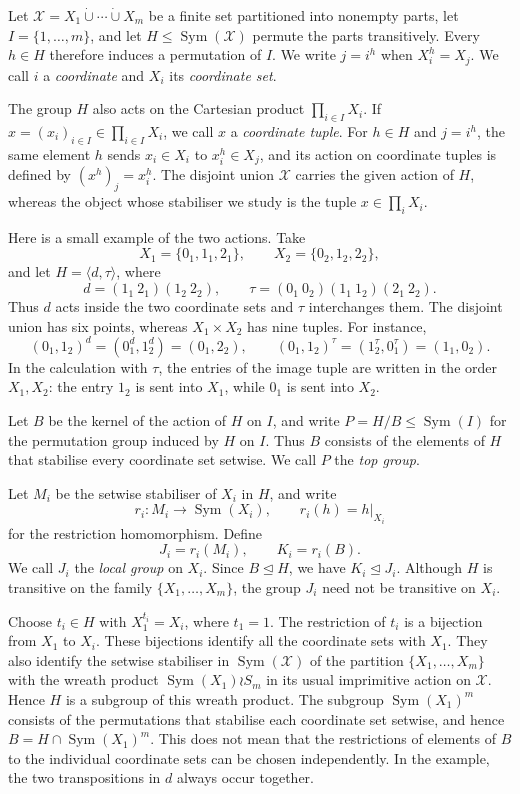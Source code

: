 \documentclass[10pt]{amsart}
\theoremstyle{definition}
\renewcommand{\leq}{\leqslant}
\DeclareMathOperator{\Sym}{Sym}
\numberwithin{equation}{section}
\numberwithin{table}{section}
\begin{document}
Let $\mathcal X=X_1\mathbin{\dot\cup}\cdots\mathbin{\dot\cup}X_m$ be a
finite set partitioned into nonempty parts, let $I=\{1,\ldots,m\}$, and
let $H\leq\Sym(\mathcal X)$ permute the parts transitively. Every $h\in H$
therefore induces a permutation of $I$. We write $j=i^h$ when
$X_i^h=X_j$. We call $i$ a {\it coordinate} and $X_i$ its
{\it coordinate set}.

The group $H$ also acts on the Cartesian product $\prod_{i\in I}X_i$. If
$x=(x_i)_{i\in I}\in\prod_{i\in I}X_i$, we call $x$ a {\it coordinate
tuple}. For $h\in H$ and $j=i^h$, the same element $h$ sends
$x_i\in X_i$ to $x_i^h\in X_j$, and its action on coordinate tuples is
defined by $(x^h)_j=x_i^h$.
The disjoint union $\mathcal X$ carries the given action of $H$, whereas the
object whose stabiliser we study is the tuple $x\in\prod_iX_i$.

Here is a small example of the two actions. Take
$$
  X_1=\{0_1,1_1,2_1\},\qquad X_2=\{0_2,1_2,2_2\},
$$
and let $H=\langle d,\tau\rangle$, where
$$
  d=(1_1\ 2_1)(1_2\ 2_2),\qquad
  \tau=(0_1\ 0_2)(1_1\ 1_2)(2_1\ 2_2).
$$
Thus $d$ acts inside the two coordinate sets and $\tau$ interchanges them.
The disjoint union has six points, whereas $X_1\times X_2$ has nine tuples.
For instance,
$$
  (0_1,1_2)^d=(0_1^d,1_2^d)=(0_1,2_2),\qquad
  (0_1,1_2)^\tau=(1_2^\tau,0_1^\tau)=(1_1,0_2).
$$
In the calculation with $\tau$, the entries of the image tuple are written in
the order $X_1,X_2$: the entry $1_2$ is sent into $X_1$, while $0_1$ is sent
into $X_2$.

Let $B$ be the kernel of the action of $H$ on $I$, and write
$P=H/B\leq\Sym(I)$ for the permutation group induced by $H$ on $I$.
Thus $B$ consists of the elements of $H$ that stabilise every coordinate
set setwise. We call $P$ the {\it top group}.

Let $M_i$ be the setwise stabiliser of $X_i$ in $H$, and write
$$
  r_i:M_i\longrightarrow\Sym(X_i),\qquad r_i(h)=h|_{X_i}
$$
for the restriction homomorphism. Define
$$
  J_i=r_i(M_i),\qquad K_i=r_i(B).
$$
We call $J_i$ the {\it local group} on $X_i$. Since $B\trianglelefteq H$, we
have $K_i\trianglelefteq J_i$. Although $H$ is transitive on the family
$\{X_1,\ldots,X_m\}$, the group $J_i$ need not be transitive on $X_i$.

Choose $t_i\in H$ with $X_1^{t_i}=X_i$, where $t_1=1$. The restriction of
$t_i$ is a bijection from $X_1$ to $X_i$. These bijections identify all the
coordinate sets with $X_1$. They also identify the setwise stabiliser in
$\Sym(\mathcal X)$ of the partition $\{X_1,\ldots,X_m\}$ with the wreath
product $\Sym(X_1)\wr S_m$ in its usual imprimitive action on $\mathcal X$.
Hence $H$ is a subgroup of this wreath product. The
subgroup $\Sym(X_1)^m$ consists of the permutations that stabilise each
coordinate set setwise, and hence $B=H\cap\Sym(X_1)^m$.
This does not mean that the restrictions of elements of $B$ to the individual
coordinate sets can be chosen independently. In the example, the two
transpositions in $d$ always occur together.
\end{document}
